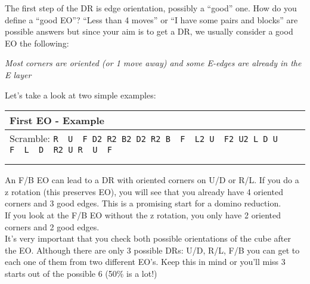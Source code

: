 \documentclass[11pt,a4paper]{book}
\newcommand{\p}{\textquotesingle}
\newcommand{\m}{\texttt}
\newcommand{\ps}{\p\,\,}
\newcommand{\comment}[1]{{\color{gray}\quad//#1}}
\begin{document}
The first step of the DR is edge orientation, possibly a “good” one. How do you define a “good EO”?  “Less than 4 moves” or “I have some pairs and blocks” are possible answers but since your aim is to get a DR, we usually consider a good EO the following: 

\begin{center}
\textit{Most corners are oriented (or 1 move away) and some E-edges are already in the E layer}
\end{center}
\bigskip
Let’s take a look at two simple examples:\\


\bigskip
\begin{tabular}{|l|}
\hline
\textbf{First EO - Example }\\
\hline
Scramble: \m{R\ps U\ps F D2 R2 B2 D2 R2 B\ps F\ps L2 U\ps F2 U2 L D U\ps F\ps L\ps D\ps R2 U R\ps U\ps F}\\
\hline
\begin{minipage}[l]{0.650\textwidth}
\bigskip
\m{U\p F \comment{ EO (F/B) (2/2) }}\\
\bigskip
\bigskip
\bigskip
\bigskip
\end{minipage}
\begin{minipage}[c]{0.25\textwidth}
\centering
\def\svgwidth{\columnwidth}

\end{minipage}\\
\hline
\end{tabular}
\bigskip
\newline
An F/B EO can lead to a DR with oriented corners on U/D or R/L.
If you do a z rotation (this preserves EO), you will see that you already have 4 oriented corners and 3 good edges. This is a promising start for a domino reduction.\\
If you look at the F/B EO without the z rotation, you only have 2 oriented corners and 2 good edges. \\
It’s very important that you check both possible orientations of the cube after the EO. Although there are only 3 possible DRs: U/D, R/L, F/B you can get to each one of them from two different EO's. Keep this in mind or you'll miss 3 starts out of the possible 6 (50\% is a lot!)\\
\end{document}
